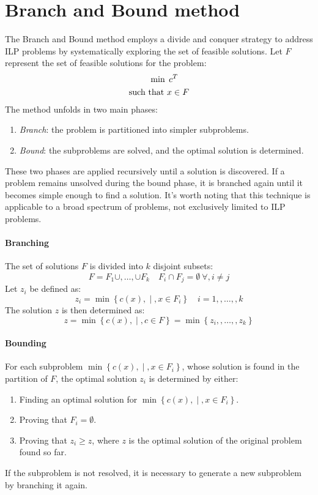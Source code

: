 \section{Branch and Bound method}
The Branch and Bound method employs a divide and conquer strategy to address ILP problems by systematically exploring the set of feasible solutions.
Let $F$ represent the set of feasible solutions for the problem:
\begin{align*}
    \min                    \:&\: c^T     \\
    \textnormal{such that }   &   x \in F \\
\end{align*}
The method unfolds in two main phases:
\begin{enumerate}
    \item \textit{Branch}: the problem is partitioned into simpler subproblems.
    \item \textit{Bound}: the subproblems are solved, and the optimal solution is determined.
\end{enumerate}
These two phases are applied recursively until a solution is discovered. 
If a problem remains unsolved during the bound phase, it is branched again until it becomes simple enough to find a solution. 
It's worth noting that this technique is applicable to a broad spectrum of problems, not exclusively limited to ILP problems.

\paragraph*{Branching}
The set of solutions $F$ is divided into $k$ disjoint subsets:
\[ F = F_1 \cup,  \ldots,  \cup F_k \quad F_i \cap F_j = \emptyset \: \forall,  i \neq j \]
Let $z_i$ be defined as:
\[ z_i = \min\left\{ c(x), \middle\vert, x \in F_i \right\} \quad i = 1,,  \ldots,  , k \]
The solution $z$ is then determined as:
\[ z = \min\left\{ c(x), \middle\vert, c \in F \right\} = \min\left\{ z_i,,  \ldots, , z_k \right\} \]

\paragraph*{Bounding}
For each subproblem $\min\left\{ c(x), \middle\vert, x \in F_i \right\}$, whose solution is found in the partition of $F$, the optimal solution $z_i$ is determined by either:
\begin{enumerate}
    \item Finding an optimal solution for $\min\left\{ c(x), \middle\vert, x \in F_i \right\}$.
    \item Proving that $F_i = \emptyset$.
    \item Proving that $z_i \geq z$, where $z$ is the optimal solution of the original problem found so far.
\end{enumerate}
If the subproblem is not resolved, it is necessary to generate a new subproblem by branching it again.

